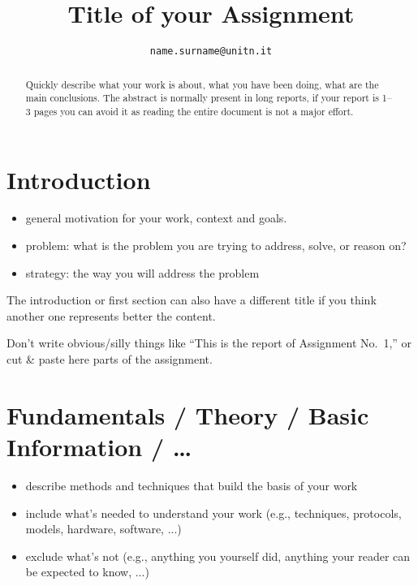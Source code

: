 \documentclass[conference]{IEEEtran}
\begin{document}
\title{Title of your Assignment}

\author{
	\texttt{name.surname@unitn.it}
}

\maketitle

\begin{abstract}
Quickly describe what your work is about, what you have been doing, what are the main conclusions.
The abstract is normally present in long reports, if your report is 1--3 pages you can avoid it as reading the entire document is not a major effort. 
\end{abstract}

\acresetall

\section{Introduction}
\label{sec:introduction}

\begin{itemize}
\item general motivation for your work, context and goals.
\item problem: what is the problem you are trying to address, solve, or reason on?
\item strategy: the way you will address the problem
\end{itemize}

The introduction or first section can also have a different title if you think another one represents better the content. 

Don't write obvious/silly things like ``This is the report of Assignment No.\ 1,'' or cut \& paste here parts of the assignment. 

\section{Fundamentals / Theory / Basic Information / \ldots}
\label{sec:fundamentals}

\begin{itemize}
\item describe methods and techniques that build the basis of your work
\item include what's needed to understand your work (e.g., techniques, protocols, models, hardware, software, ...)
\item exclude what's not (e.g., anything you yourself did, anything your reader can be expected to know, ...)
\end{itemize}
\end{document}
